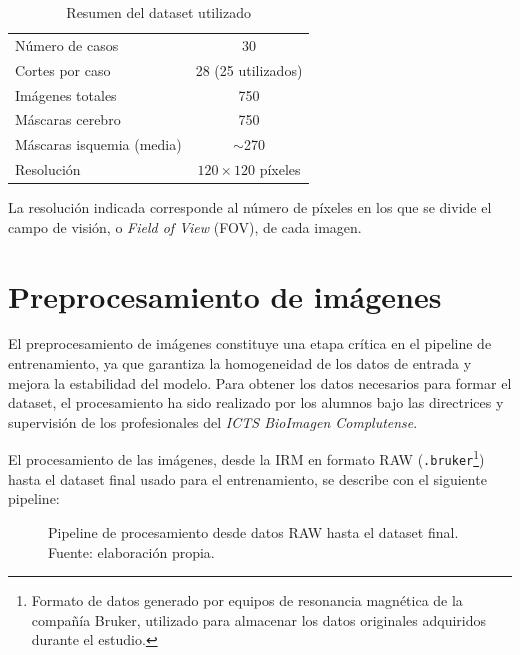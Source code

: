 \begin{table}[h]
\centering
\begin{tabular}{l c}
\hline
Número de casos & 30 \\
Cortes por caso & 28 (25 utilizados) \\
Imágenes totales & 750 \\
Máscaras cerebro & 750 \\
Máscaras isquemia (media) & $\sim$270 \\
Resolución & $120 \times 120$ píxeles \\
\hline
\end{tabular}
\caption{Resumen del dataset utilizado}
\label{tab:resumen_dataset}
\end{table}

La resolución indicada corresponde al número de píxeles en los que se divide el campo de visión, o \textit{Field of View} (FOV), de cada imagen.

\section{Preprocesamiento de imágenes}
El preprocesamiento de imágenes constituye una etapa crítica en el pipeline de entrenamiento, ya que garantiza la homogeneidad de los datos de entrada y mejora la estabilidad del modelo.
Para obtener los datos necesarios para formar el dataset, el procesamiento ha sido realizado por los alumnos bajo las directrices y supervisión de los profesionales del\textit{ ICTS BioImagen Complutense}.

El procesamiento de las imágenes, desde la IRM en formato RAW (\texttt{.bruker}\footnote{Formato de datos generado por equipos de resonancia magnética de la compañía Bruker, utilizado para almacenar los datos originales adquiridos durante el estudio.}) hasta el dataset final usado para el entrenamiento, se describe con el siguiente pipeline:

\begin{figure}[h]
\centering
{}
\caption{Pipeline de procesamiento desde datos RAW hasta el dataset final. Fuente: elaboración propia.}
\end{figure}


